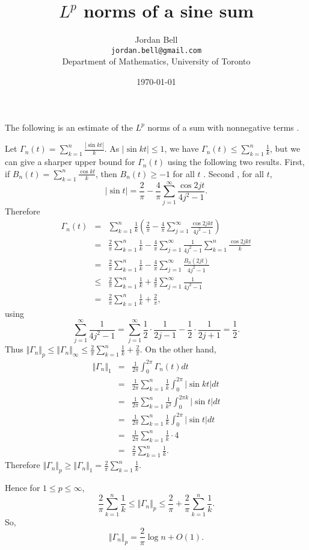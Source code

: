 \documentclass{article}
\newcommand{\norm}[1]{\Vert #1 \Vert}
\begin{document}
\title{$L^p$ norms of a sine sum}
\author{Jordan Bell\\ \texttt{jordan.bell@gmail.com}\\Department of Mathematics, University of Toronto}
\date{\today}
\maketitle

The following is an estimate of the $L^p$ norms of a sum with nonnegative terms \cite[p.~77, no.~38]{polya}.

Let $\Gamma_n(t)=\sum_{k=1}^n \frac{|\sin kt|}{k}$. As $|\sin kt| \leq 1$, we have $\Gamma_n(t) \leq \sum_{k=1}^n \frac{1}{k}$, but we can
give a sharper upper bound for $\Gamma_n(t)$ using the following two results.
First, if $B_n(t)=\sum_{k=1}^n \frac{\cos kt}{k}$, then $B_n(t) \geq  -1$ for all $t$ \cite[p.~75, no.~28]{polya}.
Second  \cite[p.~76, no.~34]{polya}, for all $t$,
\[
|\sin t|=\frac{2}{\pi}-\frac{4}{\pi}\sum_{j=1}^\infty \frac{\cos 2jt}{4j^2-1}.
\]
Therefore
\begin{eqnarray*}
\Gamma_n(t)&=&\sum_{k=1}^n \frac{1}{k} \left( \frac{2}{\pi}-\frac{4}{\pi} \sum_{j=1}^\infty \frac{\cos 2jkt}{4j^2-1} \right)\\
&=&\frac{2}{\pi}\sum_{k=1}^n \frac{1}{k}-\frac{4}{\pi}\sum_{j=1}^\infty \frac{1}{4j^2-1} \sum_{k=1}^n \frac{\cos 2jkt}{k}\\
&=&\frac{2}{\pi}\sum_{k=1}^n \frac{1}{k}-\frac{4}{\pi}\sum_{j=1}^\infty \frac{B_n(2jt)}{4j^2-1}\\
&\leq&\frac{2}{\pi}\sum_{k=1}^n \frac{1}{k}+\frac{4}{\pi}\sum_{j=1}^\infty \frac{1}{4j^2-1}\\
&=&\frac{2}{\pi}\sum_{k=1}^n \frac{1}{k}+\frac{2}{\pi},
\end{eqnarray*}
using 
\[
\sum_{j=1}^\infty \frac{1}{4j^2-1}=
\sum_{j=1}^\infty \frac{1}{2}\cdot \frac{1}{2j-1}-\frac{1}{2}\cdot \frac{1}{2j+1} 
=
\frac{1}{2}.
\]
Thus $\norm{\Gamma_n}_p \leq \norm{\Gamma_n}_\infty \leq \frac{2}{\pi}\sum_{k=1}^n \frac{1}{k}+\frac{2}{\pi}$.
On the other hand, 
\begin{eqnarray*}
\norm{\Gamma_n}_1&=&\frac{1}{2\pi}\int_0^{2\pi} \Gamma_n(t) dt\\
&=&\frac{1}{2\pi} \sum_{k=1}^n \frac{1}{k} \int_0^{2\pi} |\sin kt| dt\\
&=&\frac{1}{2\pi} \sum_{k=1}^n \frac{1}{k^2} \int_0^{2\pi k} |\sin t| dt\\
&=&\frac{1}{2\pi} \sum_{k=1}^n \frac{1}{k} \int_0^{2\pi} |\sin t| dt\\
&=&\frac{1}{2\pi} \sum_{k=1}^n \frac{1}{k} \cdot 4\\
&=&\frac{2}{\pi}\sum_{k=1}^n \frac{1}{k}. 
\end{eqnarray*}
Therefore $\norm{\Gamma_n}_p \geq \norm{\Gamma_n}_1= \frac{2}{\pi}\sum_{k=1}^n \frac{1}{k}$.

Hence for $1 \leq p \leq \infty$,
\[
 \frac{2}{\pi}\sum_{k=1}^n \frac{1}{k} \leq \norm{\Gamma_n}_p \leq \frac{2}{\pi}+ \frac{2}{\pi}\sum_{k=1}^n \frac{1}{k}.
\]
So,
\[
\norm{\Gamma_n}_p = \frac{2}{\pi} \log n + O(1).
\]



\end{document}
